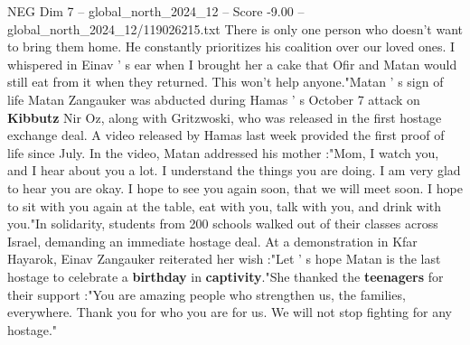\begin{textsample}{NEG Dim 7 – global\_north\_2024\_12 – Score -9.00 – global\_north\_2024\_12/119026215.txt}
There is only one person who doesn't want to bring them home.
He constantly prioritizes his coalition over our loved ones.
I whispered in Einav ' s ear when I brought her a cake that Ofir and Matan would still eat from it when they returned.
This won't help anyone."Matan ' s sign of life Matan Zangauker was abducted during Hamas ' s October 7 attack on \textbf{Kibbutz} Nir Oz, along with Gritzwoski, who was released in the first hostage exchange deal.
A video released by Hamas last week provided the first proof of life since July.
In the video, Matan addressed his mother :"Mom, I watch you, and I hear about you a lot.
I understand the things you are doing.
I am very glad to hear you are okay.
I hope to see you again soon, that we will meet soon.
I hope to sit with you again at the table, eat with you, talk with you, and drink with you."In solidarity, students from 200 schools walked out of their classes across Israel, demanding an immediate hostage deal.
At a demonstration in Kfar Hayarok, Einav Zangauker reiterated her wish :"Let ' s hope Matan is the last hostage to celebrate a \textbf{birthday} in \textbf{captivity}."She thanked the \textbf{teenagers} for their support :"You are amazing people who strengthen us, the families, everywhere.
Thank you for who you are for us.
We will not stop fighting for any hostage."

\end{textsample}
